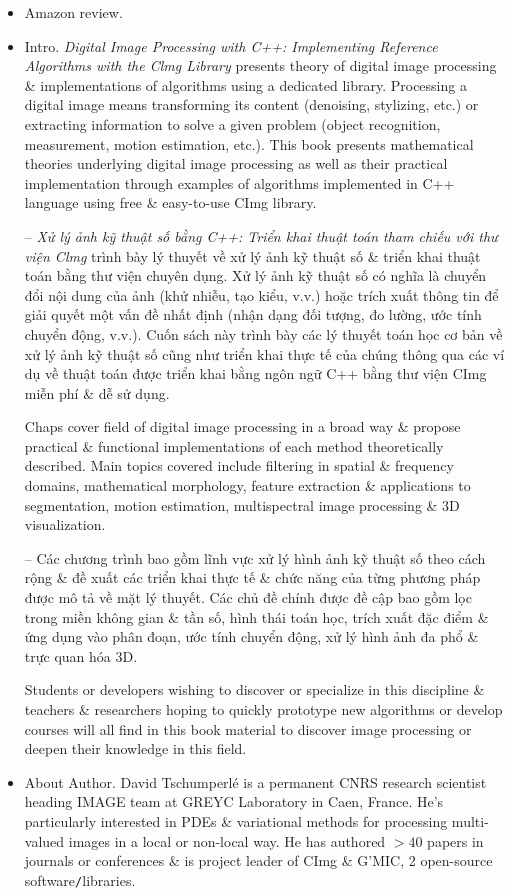 \documentclass{article}
\begin{document}
\begin{itemize}
    \item {\sf Amazon review.}
    
    \item {\sf Intro.} {\it Digital Image Processing with C++: Implementing Reference Algorithms with the Clmg Library} presents theory of digital image processing \& implementations of algorithms using a dedicated library. Processing a digital image means transforming its content (denoising, stylizing, etc.) or extracting information to solve a given problem (object recognition, measurement, motion estimation, etc.). This book presents mathematical theories underlying digital image processing as well as their practical implementation through examples of algorithms implemented in C++ language using free \& easy-to-use CImg library.
    
    -- {\it Xử lý ảnh kỹ thuật số bằng C++: Triển khai thuật toán tham chiếu với thư viện Clmg} trình bày lý thuyết về xử lý ảnh kỹ thuật số \& triển khai thuật toán bằng thư viện chuyên dụng. Xử lý ảnh kỹ thuật số có nghĩa là chuyển đổi nội dung của ảnh (khử nhiễu, tạo kiểu, v.v.) hoặc trích xuất thông tin để giải quyết một vấn đề nhất định (nhận dạng đối tượng, đo lường, ước tính chuyển động, v.v.). Cuốn sách này trình bày các lý thuyết toán học cơ bản về xử lý ảnh kỹ thuật số cũng như triển khai thực tế của chúng thông qua các ví dụ về thuật toán được triển khai bằng ngôn ngữ C++ bằng thư viện CImg miễn phí \& dễ sử dụng.
    
    Chaps cover field of digital image processing in a broad way \& propose practical \& functional implementations of each method theoretically described. Main topics covered include filtering in spatial \& frequency domains, mathematical morphology, feature extraction \& applications to segmentation, motion estimation, multispectral image processing \& 3D visualization.
    
    -- Các chương trình bao gồm lĩnh vực xử lý hình ảnh kỹ thuật số theo cách rộng \& đề xuất các triển khai thực tế \& chức năng của từng phương pháp được mô tả về mặt lý thuyết. Các chủ đề chính được đề cập bao gồm lọc trong miền không gian \& tần số, hình thái toán học, trích xuất đặc điểm \& ứng dụng vào phân đoạn, ước tính chuyển động, xử lý hình ảnh đa phổ \& trực quan hóa 3D.
    
    Students or developers wishing to discover or specialize in this discipline \& teachers \& researchers hoping to quickly prototype new algorithms or develop courses will all find in this book material to discover image processing or deepen their knowledge in this field.
    \item {\sf About Author.} {\sc David Tschumperlé} is a permanent CNRS research scientist heading IMAGE team at GREYC Laboratory in Caen, France. He's particularly interested in PDEs \& variational methods for processing multi-valued images in a local or non-local way. He has authored $> 40$ papers in journals or conferences \& is project leader of CImg \& G'MIC, 2 open-source software{\tt/}libraries.
    

\end{itemize}
\end{document}

